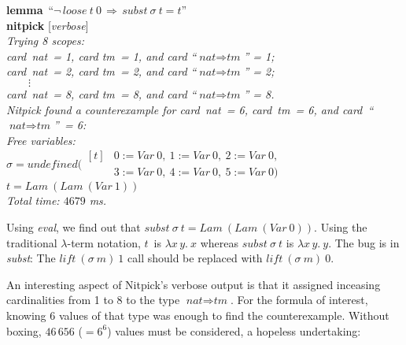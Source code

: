 \documentclass[a4paper,12pt]{article}
\def\undef{\textit{undefined}}
\begin{document}
\pre
\textbf{lemma}~``$\lnot\,\textit{loose}~t~0 \,\Longrightarrow\, \textit{subst}~\sigma~t = t$'' \\
\textbf{nitpick} [\textit{verbose}] \\[2\smallskipamount]
\slshape
Trying 8 scopes: \nopagebreak \\
\hbox{}\qquad \textit{card~nat}~= 1, \textit{card tm}~= 1, and \textit{card} ``$\textit{nat} \Rightarrow \textit{tm}$'' = 1; \\
\hbox{}\qquad \textit{card~nat}~= 2, \textit{card tm}~= 2, and \textit{card} ``$\textit{nat} \Rightarrow \textit{tm}$'' = 2; \\
\hbox{}\qquad $\qquad\vdots$ \\[.5\smallskipamount]
\hbox{}\qquad \textit{card~nat}~= 8, \textit{card tm}~= 8, and \textit{card} ``$\textit{nat} \Rightarrow \textit{tm}$'' = 8. \\[2\smallskipamount]
Nitpick found a counterexample for \textit{card~nat}~= 6, \textit{card~tm}~= 6,
and \textit{card}~``$\textit{nat} \Rightarrow \textit{tm}$''~= 6: \\[2\smallskipamount]
\hbox{}\qquad Free variables: \nopagebreak \\
\hbox{}\qquad\qquad $\sigma = \undef(\!\begin{aligned}[t]
& 0 := \textit{Var}~0,\>
  1 := \textit{Var}~0,\>
  2 := \textit{Var}~0, \\[-2pt]
& 3 := \textit{Var}~0,\>
  4 := \textit{Var}~0,\>
  5 := \textit{Var}~0)\end{aligned}$ \\
\hbox{}\qquad\qquad $t = \textit{Lam}~(\textit{Lam}~(\textit{Var}~1))$ \\[2\smallskipamount]
Total time: $4679$ ms.
\postw

Using \textit{eval}, we find out that $\textit{subst}~\sigma~t =
\textit{Lam}~(\textit{Lam}~(\textit{Var}~0))$. Using the traditional
$\lambda$-term notation, $t$~is
$\lambda x\, y.\> x$ whereas $\textit{subst}~\sigma~t$ is $\lambda x\, y.\> y$.
The bug is in \textit{subst}: The $\textit{lift}~(\sigma~m)~1$ call should be
replaced with $\textit{lift}~(\sigma~m)~0$.

An interesting aspect of Nitpick's verbose output is that it assigned inceasing
cardinalities from 1 to 8 to the type $\textit{nat} \Rightarrow \textit{tm}$.
For the formula of interest, knowing 6 values of that type was enough to find
the counterexample. Without boxing, $46\,656$ ($= 6^6$) values must be
considered, a hopeless undertaking:
\end{document}
